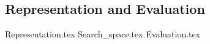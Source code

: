 \subsection{Representation and Evaluation}
\label{sec:bg:gp:repr_ev}
  {Representation.tex}
  {Search_space.tex}
  {Evaluation.tex}
